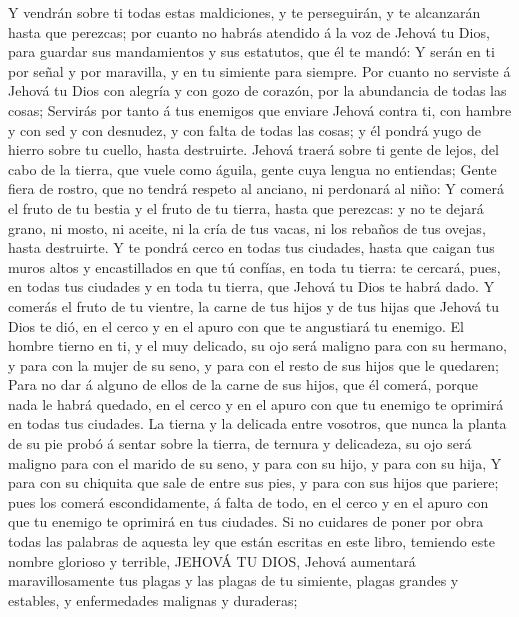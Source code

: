  Y vendrán sobre ti todas estas maldiciones, y te
perseguirán, y te alcanzarán hasta que perezcas; por cuanto no habrás
atendido á la voz de Jehová tu Dios, para guardar sus mandamientos y sus
estatutos, que él te mandó:  Y serán en ti por señal y por
maravilla, y en tu simiente para siempre.  Por cuanto no
serviste á Jehová tu Dios con alegría y con gozo de corazón, por la
abundancia de todas las cosas;  Servirás por tanto á tus
enemigos que enviare Jehová contra ti, con hambre y con sed y con
desnudez, y con falta de todas las cosas; y él pondrá yugo de hierro
sobre tu cuello, hasta destruirte.  Jehová traerá sobre ti
gente de lejos, del cabo de la tierra, que vuele como águila, gente cuya
lengua no entiendas;  Gente fiera de rostro, que no tendrá
respeto al anciano, ni perdonará al niño:  Y comerá el
fruto de tu bestia y el fruto de tu tierra, hasta que perezcas: y no te
dejará grano, ni mosto, ni aceite, ni la cría de tus vacas, ni los
rebaños de tus ovejas, hasta destruirte.  Y te pondrá cerco
en todas tus ciudades, hasta que caigan tus muros altos y encastillados
en que tú confías, en toda tu tierra: te cercará, pues, en todas tus
ciudades y en toda tu tierra, que Jehová tu Dios te habrá dado.
 Y comerás el fruto de tu vientre, la carne de tus hijos y
de tus hijas que Jehová tu Dios te dió, en el cerco y en el apuro con
que te angustiará tu enemigo.  El hombre tierno en ti, y el
muy delicado, su ojo será maligno para con su hermano, y para con la
mujer de su seno, y para con el resto de sus hijos que le quedaren;
 Para no dar á alguno de ellos de la carne de sus hijos,
que él comerá, porque nada le habrá quedado, en el cerco y en el apuro
con que tu enemigo te oprimirá en todas tus ciudades.  La
tierna y la delicada entre vosotros, que nunca la planta de su pie probó
á sentar sobre la tierra, de ternura y delicadeza, su ojo será maligno
para con el marido de su seno, y para con su hijo, y para con su hija,
 Y para con su chiquita que sale de entre sus pies, y para
con sus hijos que pariere; pues los comerá escondidamente, á falta de
todo, en el cerco y en el apuro con que tu enemigo te oprimirá en tus
ciudades.  Si no cuidares de poner por obra todas las
palabras de aquesta ley que están escritas en este libro, temiendo este
nombre glorioso y terrible, JEHOVÁ TU DIOS,  Jehová
aumentará maravillosamente tus plagas y las plagas de tu simiente,
plagas grandes y estables, y enfermedades malignas y duraderas;
